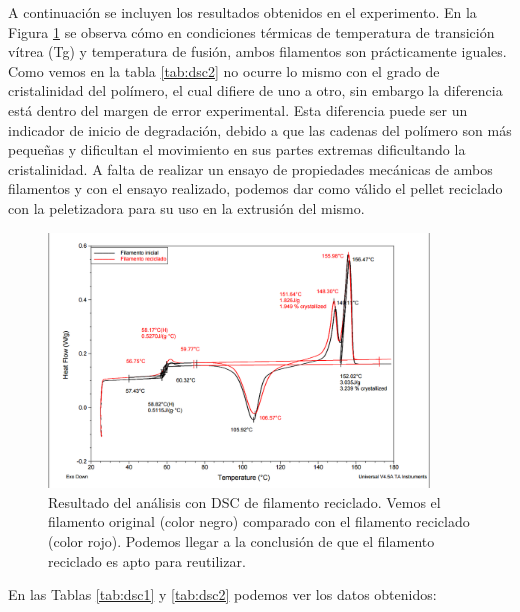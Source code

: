 A continuación se incluyen los resultados obtenidos en el experimento. En la Figura \ref{fig:analisis_dsc} se observa cómo en condiciones térmicas de temperatura de transición vítrea (Tg) y temperatura de fusión, ambos filamentos son prácticamente iguales. Como vemos en la tabla \ref{tab:dsc2} no ocurre lo mismo con el grado de cristalinidad del polímero, el cual difiere de uno a otro, sin embargo la diferencia está dentro del margen de error experimental. Esta diferencia puede ser un indicador de inicio de degradación, debido a que las cadenas del polímero son más pequeñas y dificultan el movimiento en sus partes extremas dificultando la cristalinidad. A falta de realizar un ensayo de propiedades mecánicas de ambos filamentos y con el ensayo realizado, podemos dar como válido el pellet reciclado con la peletizadora para su uso en la extrusión del mismo.

\begin{figure}[H]
    \centering
    \includegraphics[width=0.9\textwidth]{images/dsc2.png}
    \caption[Resultado del análisis con DSC de filamento reciclado.]{Resultado del análisis con DSC de filamento reciclado. Vemos el filamento original (color negro) comparado con el filamento reciclado (color rojo). Podemos llegar a la conclusión de que el filamento reciclado es apto para reutilizar.}
    \label{fig:analisis_dsc}
\end{figure}

En las Tablas \ref{tab:dsc1} y \ref{tab:dsc2} podemos ver los datos obtenidos:

